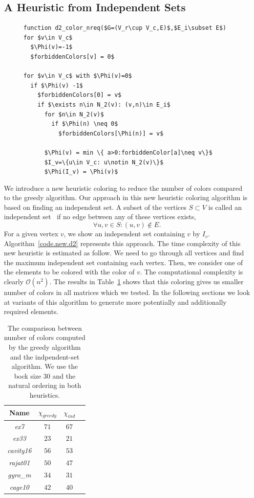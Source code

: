 \documentclass[11pt, twoside,a4paper]{book}
\newcommand{\coderef}[1]{Algorithm~\protect\ref{#1}}
\begin{document}
\subsection{A Heuristic from Independent Sets}
\label{s.heuristic.indset}
\begin{figure}
\begin{lstlisting}[caption=New coloring heuristic for distance-$2$ coloring
considering the nonrequired elements.,label=code.new.d2,mathescape]
function d2_color_nreq($G=(V_r\cup V_c,E)$,$E_i\subset E$)
for $v\in V_c$
  $\Phi(v)=-1$
  $forbiddenColors[v] = 0$

for $v\in V_c$ with $\Phi(v)=0$
  if $\Phi(v) -1$
    $forbiddenColors[0] = v$
    if $\exists n\in N_2(v): (v,n)\in E_i$
      for $n\in N_2(v)$
        if $\Phi(n) \neq 0$
          $forbiddenColors[\Phi(n)] = v$

      $\Phi(v) = min \{ a>0:forbiddenColor[a]\neq v\}$
      $I_v=\{u\in V_c: u\notin N_2(v)\}$
      $\Phi(I_v) = \Phi(v)$
\end{lstlisting}
\end{figure}
We introduce a new heuristic coloring to reduce the number of colors compared to
the greedy algorithm.
Our approach in this new heuristic coloring algorithm is based on finding an independent set.
A subset of the vertices $S\subset V$ is
called an independent set~\cite{bondy2008graph} if no edge between any of these vertices exists,
$$\forall u,v\in S: (u,v)\notin E.$$
For a given vertex $v$, we show an independent set containing $v$ by $I_v$.
\coderef{code.new.d2} represents this approach.
The time complexity of this new heuristic is estimated as follow.
We need to go through all vertices
and find the maximum independent set containing each vertex.
Then, we consider one of the elements to be colored with the color of $v$.
The computational complexity is clearly $\mathcal{O}(n^2)$.
The results in Table~\ref{greedy.vs.ind} shows that this coloring gives us smaller number of colors
in all matrices which we tested. 
In the following sections we look at variants of this algorithm to generate more potentially and
additionally required elements.
\begin{table}
\centering
\begin{tabular}{|c|c|c|c|}
\hline
Name & $\chi_{greedy}$ & $\chi_{ind}$\\\hline
\textit{ex7} & $71$ & $67$ \\\hline
\textit{ex33} & $23$ & $21$ \\\hline
\textit{cavity16} & $56$ & $53$\\\hline
\textit{rajat01} & $50$ & $47$\\\hline
\textit{gyro\_m} & $34$ & $31$ \\\hline
\textit{cage10} & $42$ & $40$\\\hline
\end{tabular}
\caption{
The comparison between number of colors computed by the greedy algorithm and 
the indpendent-set algorithm.
We use the bock size $30$ and the natural ordering in both heuristics.
}
\label{greedy.vs.ind}
\end{table}
\end{document}
